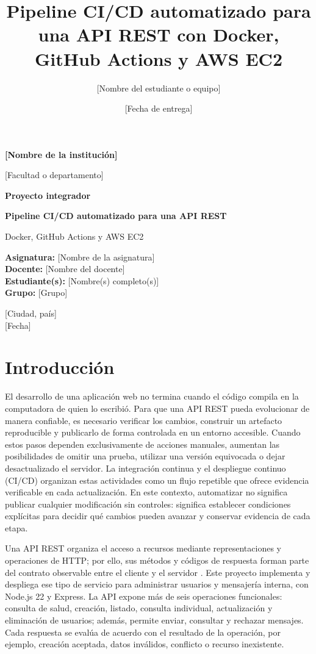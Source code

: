 \documentclass[12pt,letterpaper]{article}
\title{Pipeline CI/CD automatizado para una API REST con Docker, GitHub Actions y AWS EC2}
\author{[Nombre del estudiante o equipo]}
\date{[Fecha de entrega]}
\begin{document}
\begin{titlepage}
\centering
\vspace*{1.2cm}
{\Large\bfseries [Nombre de la institución]\par}
\vspace{0.5cm}
{\large [Facultad o departamento]\par}
\vspace{1.8cm}
{\large\bfseries Proyecto integrador\par}
\vspace{0.5cm}
{\LARGE\bfseries Pipeline CI/CD automatizado para una API REST\par}
\vspace{0.5cm}
{\large Docker, GitHub Actions y AWS EC2\par}
\vfill
\begin{flushleft}
\textbf{Asignatura:} [Nombre de la asignatura]\\
\textbf{Docente:} [Nombre del docente]\\
\textbf{Estudiante(s):} [Nombre(s) completo(s)]\\
\textbf{Grupo:} [Grupo]
\end{flushleft}
\vfill
{\large [Ciudad, país]\\[0.3cm][Fecha]\par}
\end{titlepage}

\section*{Introducción}
El desarrollo de una aplicación web no termina cuando el código compila en la computadora de quien lo escribió. Para que una API REST pueda evolucionar de manera confiable, es necesario verificar los cambios, construir un artefacto reproducible y publicarlo de forma controlada en un entorno accesible. Cuando estos pasos dependen exclusivamente de acciones manuales, aumentan las posibilidades de omitir una prueba, utilizar una versión equivocada o dejar desactualizado el servidor. La integración continua y el despliegue continuo (CI/CD) organizan estas actividades como un flujo repetible que ofrece evidencia verificable en cada actualización. En este contexto, automatizar no significa publicar cualquier modificación sin controles: significa establecer condiciones explícitas para decidir qué cambios pueden avanzar y conservar evidencia de cada etapa.

Una API REST organiza el acceso a recursos mediante representaciones y operaciones de HTTP; por ello, sus métodos y códigos de respuesta forman parte del contrato observable entre el cliente y el servidor \cite{fielding2000,rfc9110}. Este proyecto implementa y despliega ese tipo de servicio para administrar usuarios y mensajería interna, con Node.js 22 y Express. La API expone más de seis operaciones funcionales: consulta de salud, creación, listado, consulta individual, actualización y eliminación de usuarios; además, permite enviar, consultar y rechazar mensajes. Cada respuesta se evalúa de acuerdo con el resultado de la operación, por ejemplo, creación aceptada, datos inválidos, conflicto o recurso inexistente.
\end{document}
